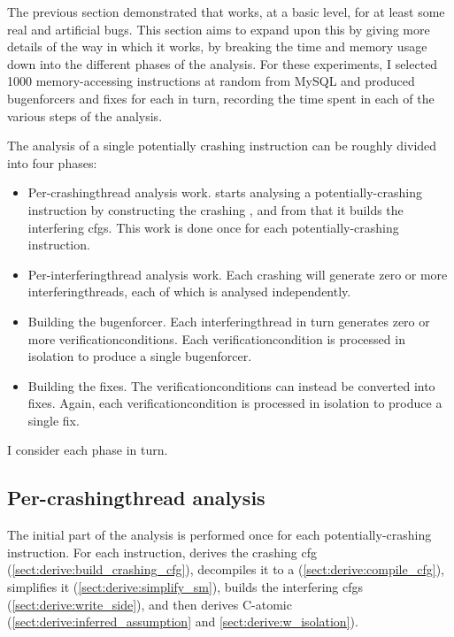 The previous section demonstrated that {\technique} works, at a basic
level, for at least some real and artificial bugs.  This section aims
to expand upon this by giving more details of the way in which it
works, by breaking the time and memory usage down into the different
phases of the analysis.  For these experiments, I selected 1000
memory-accessing instructions at random from MySQL and produced
\glspl{bugenforcer} and fixes for each in turn, recording the time
spent in each of the various steps of the analysis.

The analysis of a single potentially crashing instruction can be
roughly divided into four phases:
\begin{itemize}
\item Per-\gls{crashingthread} analysis work.  {\Technique} starts
  analysing a potentially-crashing instruction by constructing the
  crashing {\StateMachine}, and from that it builds the interfering
  \glspl{cfg}.  This work is done once for each potentially-crashing
  instruction.
\item Per-\gls{interferingthread} analysis work.  Each crashing
  {\StateMachine} will generate zero or more
  \glspl{interferingthread}, each of which is analysed independently.
\item Building the \gls{bugenforcer}.  Each \gls{interferingthread} in
  turn generates zero or more \glspl{verificationcondition}.  Each
  \gls{verificationcondition} is processed in isolation to produce a
  single \gls{bugenforcer}.
\item Building the fixes.  The \glspl{verificationcondition} can
  instead be converted into fixes.  Again, each
  \gls{verificationcondition} is processed in isolation to produce a
  single fix.
\end{itemize}
I consider each phase in turn.

\subsection{Per-\gls{crashingthread} analysis}

The initial part of the analysis is performed once for each
potentially-crashing instruction.  For each instruction, {\technique}
derives the crashing \gls{cfg}
(\autoref{sect:derive:build_crashing_cfg}), decompiles it to a
{\StateMachine} (\autoref{sect:derive:compile_cfg}), simplifies it
(\autoref{sect:derive:simplify_sm}), builds the interfering
\glspl{cfg} (\autoref{sect:derive:write_side}), and then derives
C-atomic (\autoref{sect:derive:inferred_assumption} and
\autoref{sect:derive:w_isolation}).

